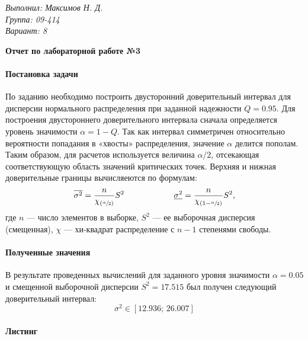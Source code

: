 \documentclass{article}
\begin{document}

\begin{flushright}
    \textit{Выполнил: Максимов Н. Д.} \\
    \textit{Группа: 09-414} \\
    \textit{Вариант: 8}
\end{flushright}

\begin{center}
    \bfseries\LARGE Отчет по лабораторной работе №3
\end{center}
\bigskip


\paragraph{Постановка задачи} По заданию необходимо построить двусторонний доверительный интервал для дисперсии нормального распределения  при заданной надежности $Q=0.95$. Для построения двустороннего доверительного интервала сначала определяется уровень значимости $\alpha = 1 - Q$. Так как интервал симметричен относительно вероятности попадания в «хвосты» распределения, значение $\alpha$ делится пополам. Таким образом, для расчетов используется величина $\alpha/2$, отсекающая соответствующую область значений критических точек. Верхняя и нижная доверительные границы вычисляеются по формулам:
\[ \overline{\sigma^2} = \frac{n}{\chi_{(\sfrac\alpha2)}}S^2 \qquad\qquad\qquad \underline{\sigma^2} = \frac{n}{\chi_{(1 - \sfrac\alpha2)}} S^2, \]
где $n$ --- число элементов в выборке, $S^2$ ---  ее выборочная дисперсия (смещенная), $\chi$ --- хи-квадрат распределение с $n-1$ степенями свободы.


\paragraph{Полученные значения} В результате проведенных вычислений для заданного уровня значимости $\alpha = 0.05$ и смещенной выборочной дисперсии $S^2 = 17.515$ был получен следующий доверительный интервал:
\[ \sigma^2 \in [12.936; \, 26.007] \]


\paragraph{Листинг}
\end{document}
